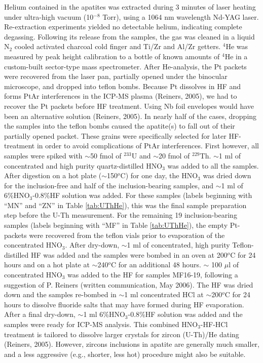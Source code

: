 \documentclass{article}
\begin{document}
Helium contained  in the  apatites was extracted  during 3  minutes of
laser heating  under ultra-high vacuum (10$^{-8}$ Torr),  using a 1064
nm  wavelength  Nd-YAG laser.   Re-extraction  experiments yielded  no
detectable  helium,  indicating  complete  degassing.   Following  its
release from the samples, the gas was cleaned in a liquid N$_2$ cooled
activated charcoal cold finger and Ti/Zr and Al/Zr getters. $^4$He was
measured by  peak height calibration to  a bottle of  known amounts of
$^4$He  in  a   custom-built  sector-type  mass  spectrometer.   After
He-analysis,  the  Pt  packets  were  recovered from  the  laser  pan,
partially  opened under  the  binocular microscope,  and dropped  into
teflon bombs. Because Pt dissolves  in HF and forms PtAr interferences
in the ICP-MS plasma (Reiners, 2005), we had to recover the Pt packets
before  HF treatment.   Using Nb  foil  envelopes would  have been  an
alternative solution  (Reiners, 2005).  In  nearly half of  the cases,
dropping the  samples into the  teflon bombs caused the  apatite(s) to
fall  out  of  their  partially  opened  packet.   These  grains  were
specifically  selected  for  later  HF-treatment  in  order  to  avoid
complications of PtAr interferences.   First however, all samples were
spiked  with   $\sim$50  fmol  of  $^{233}$U  and   $\sim$20  fmol  of
$^{229}$Th.    $\sim$1   ml    of   concentrated   and   high   purity
quartz-distilled  HNO$_3$  was  added   to  all  the  samples.   After
digestion on a hot plate ($\sim$150$^o$C) for one day, the HNO$_3$ was
dried down  for the inclusion-free  and half of  the inclusion-bearing
samples, and $\sim$1 ml of 6\%HNO$_3$-0.8\%HF solution was added.  For
these  samples  (labels beginning  with  ``MN''  and  ``ZN'' in  Table
\ref{tab:UThHe}), this  was the  final sample preparation  step before
the U-Th measurement.  For  the remaining 19 inclusion-bearing samples
(labels  beginning with  ``MF'' in  Table \ref{tab:UThHe}),  the empty
Pt-packets were  recovered from the teflon vials  prior to evaporation
of  the   concentrated  HNO$_3$.    After  dry-down,  $\sim$1   ml  of
concentrated,  high  purity  Teflon-distilled  HF was  added  and  the
samples were bombed in  an oven at 200$^o$C for 24 hours  and on a hot
plate at $\sim$240$^o$C for an  additional 48 hours. $\sim$ 100 $\mu$l
of  concentrated HNO$_3$  was added  to  the HF  for samples  MF16-19,
following  a  suggestion of  P.  Reiners  (written communication,  May
2006).  The HF was dried down  and the samples re-bombed in $\sim$1 ml
concentrated HCl  at $\sim$200$^o$C for 24 hours  to dissolve fluoride
salts  that may  have formed  during  HF evaporation.   After a  final
dry-down,  $\sim$1 ml  6\%HNO$_3$-0.8\%HF solution  was added  and the
samples were ready for  ICP-MS analysis.  This combined HNO$_3$-HF-HCl
treatment is tailored to dissolve larger crystals for zircon (U-Th)/He
dating (Reiners,  2005).  However,  zircons inclusions in  apatite are
generally  much smaller, and  a less  aggressive (e.g.,  shorter, less
hot) procedure
might also be suitable.\\
\end{document}
